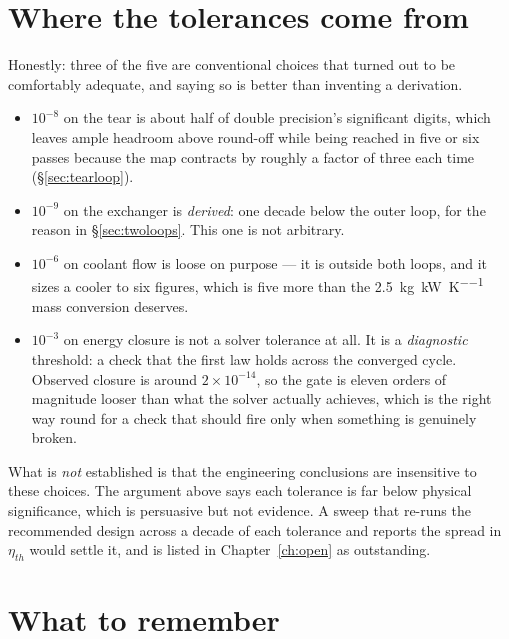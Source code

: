 \documentclass[11pt,a4paper]{report}
\begin{document}
\section{Where the tolerances come from}

Honestly: three of the five are conventional choices that turned out to be
comfortably adequate, and saying so is better than inventing a derivation.

\begin{itemize}\itemsep3pt
\item $10^{-8}$ on the tear is about half of double precision's
      significant digits, which leaves ample headroom above round-off
      while being reached in five or six passes because the map contracts
      by roughly a factor of three each time (\S\ref{sec:tearloop}).
\item $10^{-9}$ on the exchanger is \emph{derived}: one decade below the
      outer loop, for the reason in \S\ref{sec:twoloops}. This one is not
      arbitrary.
\item $10^{-6}$ on coolant flow is loose on purpose --- it is outside both
      loops, and it sizes a cooler to six figures, which is five more than
      the \SI{2.5}{\kilo\gram\per\kilo\watt\per\kelvin} mass conversion
      deserves.
\item $10^{-3}$ on energy closure is not a solver tolerance at all. It is
      a \emph{diagnostic} threshold: a check that the first law holds
      across the converged cycle. Observed closure is around
      $2\times10^{-14}$, so the gate is eleven orders of magnitude looser
      than what the solver actually achieves, which is the right way round
      for a check that should fire only when something is genuinely broken.
\end{itemize}

\begin{caveat}[title={Not yet verified}]
What is \emph{not} established is that the engineering conclusions are
insensitive to these choices. The argument above says each tolerance is
far below physical significance, which is persuasive but not evidence.
A sweep that re-runs the recommended design across a decade of each
tolerance and reports the spread in $\eta_{th}$ would settle it, and is
listed in Chapter~\ref{ch:open} as outstanding.
\end{caveat}

\section{What to remember}
\end{document}
